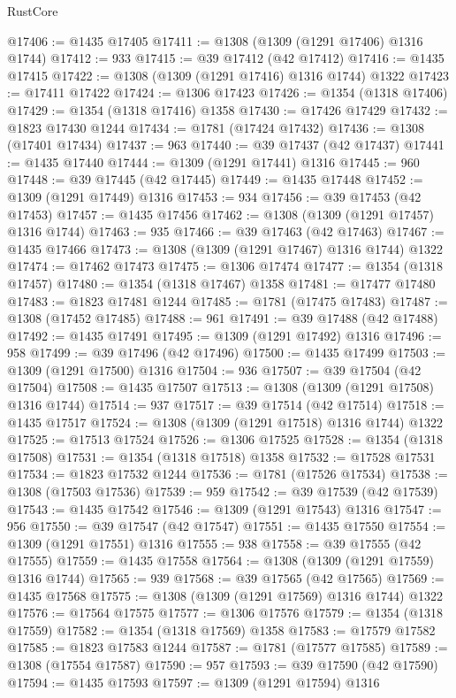 \begin{lexlean}{RustCore}
\begin{coremodule}
@17406 := @1435 @17405
@17411 := @1308 (@1309 (@1291 @17406) @1316 @1744)
@17412 := 933
@17415 := @39 @17412 (@42 @17412)
@17416 := @1435 @17415
@17422 := @1308 (@1309 (@1291 @17416) @1316 @1744) @1322
@17423 := @17411 @17422
@17424 := @1306 @17423
@17426 := @1354 (@1318 @17406)
@17429 := @1354 (@1318 @17416) @1358
@17430 := @17426 @17429
@17432 := @1823 @17430 @1244
@17434 := @1781 (@17424 @17432)
@17436 := @1308 (@17401 @17434)
@17437 := 963
@17440 := @39 @17437 (@42 @17437)
@17441 := @1435 @17440
@17444 := @1309 (@1291 @17441) @1316
@17445 := 960
@17448 := @39 @17445 (@42 @17445)
@17449 := @1435 @17448
@17452 := @1309 (@1291 @17449) @1316
@17453 := 934
@17456 := @39 @17453 (@42 @17453)
@17457 := @1435 @17456
@17462 := @1308 (@1309 (@1291 @17457) @1316 @1744)
@17463 := 935
@17466 := @39 @17463 (@42 @17463)
@17467 := @1435 @17466
@17473 := @1308 (@1309 (@1291 @17467) @1316 @1744) @1322
@17474 := @17462 @17473
@17475 := @1306 @17474
@17477 := @1354 (@1318 @17457)
@17480 := @1354 (@1318 @17467) @1358
@17481 := @17477 @17480
@17483 := @1823 @17481 @1244
@17485 := @1781 (@17475 @17483)
@17487 := @1308 (@17452 @17485)
@17488 := 961
@17491 := @39 @17488 (@42 @17488)
@17492 := @1435 @17491
@17495 := @1309 (@1291 @17492) @1316
@17496 := 958
@17499 := @39 @17496 (@42 @17496)
@17500 := @1435 @17499
@17503 := @1309 (@1291 @17500) @1316
@17504 := 936
@17507 := @39 @17504 (@42 @17504)
@17508 := @1435 @17507
@17513 := @1308 (@1309 (@1291 @17508) @1316 @1744)
@17514 := 937
@17517 := @39 @17514 (@42 @17514)
@17518 := @1435 @17517
@17524 := @1308 (@1309 (@1291 @17518) @1316 @1744) @1322
@17525 := @17513 @17524
@17526 := @1306 @17525
@17528 := @1354 (@1318 @17508)
@17531 := @1354 (@1318 @17518) @1358
@17532 := @17528 @17531
@17534 := @1823 @17532 @1244
@17536 := @1781 (@17526 @17534)
@17538 := @1308 (@17503 @17536)
@17539 := 959
@17542 := @39 @17539 (@42 @17539)
@17543 := @1435 @17542
@17546 := @1309 (@1291 @17543) @1316
@17547 := 956
@17550 := @39 @17547 (@42 @17547)
@17551 := @1435 @17550
@17554 := @1309 (@1291 @17551) @1316
@17555 := 938
@17558 := @39 @17555 (@42 @17555)
@17559 := @1435 @17558
@17564 := @1308 (@1309 (@1291 @17559) @1316 @1744)
@17565 := 939
@17568 := @39 @17565 (@42 @17565)
@17569 := @1435 @17568
@17575 := @1308 (@1309 (@1291 @17569) @1316 @1744) @1322
@17576 := @17564 @17575
@17577 := @1306 @17576
@17579 := @1354 (@1318 @17559)
@17582 := @1354 (@1318 @17569) @1358
@17583 := @17579 @17582
@17585 := @1823 @17583 @1244
@17587 := @1781 (@17577 @17585)
@17589 := @1308 (@17554 @17587)
@17590 := 957
@17593 := @39 @17590 (@42 @17590)
@17594 := @1435 @17593
@17597 := @1309 (@1291 @17594) @1316

\end{coremodule}
\end{lexlean}
